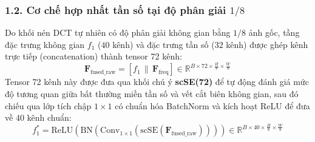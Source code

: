 \subsubsection{1.2. Cơ chế hợp nhất tần số tại độ phân giải $1/8$}
\indent\indent Do khối nén DCT tự nhiên có độ phân giải không gian bằng $1/8$ ảnh gốc, tầng đặc trưng không gian $f_1$ ($40$ kênh) và đặc trưng tần số ($32$ kênh) được ghép kênh trực tiếp (concatenation) thành tensor 72 kênh:
\begin{equation}
\mathbf{F}_{\text{fused\_raw}} = [f_1 \,\|\, \mathbf{F}_{\text{freq}}] \in \mathbb{R}^{B \times 72 \times \frac{H}{8} \times \frac{W}{8}}
\end{equation}
Tensor 72 kênh này được đưa qua khối chú ý \textbf{scSE(72)} để tự động đánh giá mức độ tương quan giữa bất thường miền tần số và vết cắt biên không gian, sau đó chiếu qua lớp tích chập $1 \times 1$ có chuẩn hóa BatchNorm và kích hoạt ReLU để đưa về 40 kênh chuẩn:
\begin{equation}
f_1^* = \text{ReLU}\left(\text{BN}\left(\text{Conv}_{1 \times 1}\left(\text{scSE}(\mathbf{F}_{\text{fused\_raw}})\right)\right)\right) \in \mathbb{R}^{B \times 40 \times \frac{H}{8} \times \frac{W}{8}}
\end{equation}


